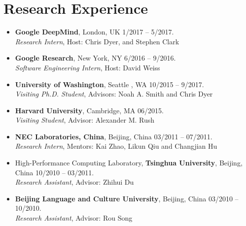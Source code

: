 \documentclass[letterpaper]{article}
\begin{document}
\section*{Research Experience}

\begin{itemize}
\item \textbf{Google DeepMind}, London, UK 1/2017 -- 5/2017.\\
{\it Research Intern}, Host: Chris Dyer, and Stephen Clark\\

\item \textbf{Google Research}, New York, NY 6/2016 -- 9/2016.\\
{\it Software Engineering Intern}, Host: David Weiss\\

\item \textbf{University of Washington}, Seattle , WA 10/2015 -- 9/2017.\\
{\it Visiting Ph.D. Student}, Advisors: Noah A. Smith and Chris Dyer\\

\item \textbf{Harvard University}, Cambridge, MA 06/2015.\\
{\it Visiting Student}, Advisor: Alexander M. Rush\\

\item \textbf{NEC Laboratories, China}, Beijing, China 03/2011 -- 07/2011.\\
{\it Research Intern}, Mentors: Kai Zhao, Likun Qiu and Changjian Hu\\

\item High-Performance Computing Laboratory, \textbf{Tsinghua University}, Beijing, China 10/2010 -- 03/2011.\\
{\it Research Assistant}, Advisor: Zhihui Du\\

\item \textbf{Beijing Language and Culture University}, Beijing, China 03/2010 -- 10/2010.\\
{\it Research Assistant}, Advisor: Rou Song\\


\end{itemize}
\end{document}
